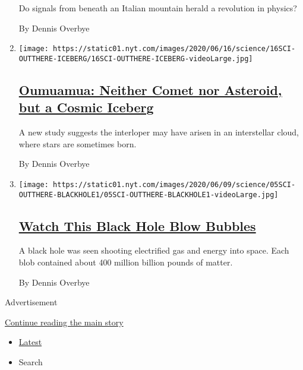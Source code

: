 \begin{enumerate}
  Do signals from beneath an Italian mountain herald a revolution in
  physics?

  By Dennis Overbye
\item
  \texttt{[image: https://static01.nyt.com/images/2020/06/16/science/16SCI-OUTTHERE-ICEBERG/16SCI-OUTTHERE-ICEBERG-videoLarge.jpg]}

  \hypertarget{oumuamua-neither-comet-nor-asteroid-but-a-cosmic-iceberg}{%
  \subsection{\texorpdfstring{\href{/2020/06/15/science/oumuamua-astronomy-comets.html}{Oumuamua:
  Neither Comet nor Asteroid, but a Cosmic
  Iceberg}}{Oumuamua: Neither Comet nor Asteroid, but a Cosmic Iceberg}}\label{oumuamua-neither-comet-nor-asteroid-but-a-cosmic-iceberg}}

  A new study suggests the interloper may have arisen in an interstellar
  cloud, where stars are sometimes born.

  By Dennis Overbye
\item
  \texttt{[image: https://static01.nyt.com/images/2020/06/09/science/05SCI-OUTTHERE-BLACKHOLE1/05SCI-OUTTHERE-BLACKHOLE1-videoLarge.jpg]}

  \hypertarget{watch-this-black-hole-blow-bubbles}{%
  \subsection{\texorpdfstring{\href{/2020/06/05/science/black-hole-astronomy.html}{Watch
  This Black Hole Blow
  Bubbles}}{Watch This Black Hole Blow Bubbles}}\label{watch-this-black-hole-blow-bubbles}}

  A black hole was seen shooting electrified gas and energy into space.
  Each blob contained about 400 million billion pounds of matter.

  By Dennis Overbye
\end{enumerate}

Advertisement

\protect\hyperlink{after-mid2}{Continue reading the main story}

\begin{itemize}
\tightlist
\item
  \protect\hyperlink{stream-panel}{Latest}
\item
  Search
\end{itemize}

